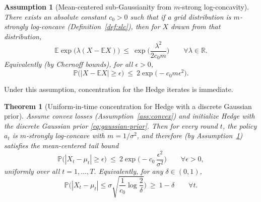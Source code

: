 \documentclass[11pt]{article}
\newtheorem{theorem}{Theorem}
\newtheorem{assumption}{Assumption}
\newtheorem{remark}{Remark}
\begin{document}
\begin{assumption}[Mean-centered sub-Gaussianity from $m$-strong log-concavity]\label{ass:subg}
    There exists an absolute constant $c_0>0$ such that if a grid distribution is $m$-strongly log-concave (Definition~\ref{def:slc}), then for $X$ drawn from that distribution,
    \[
        \mathbb{E}\exp\!\big(\lambda(X-\mathbb{E}X)\big)\ \le\ \exp\!\Big(\frac{\lambda^2}{2c_0 m}\Big)
        \qquad\forall \lambda\in\mathbb{R}.
    \]
    Equivalently (by Chernoff bounds), for all $\epsilon>0$,
    \[
        \mathbb{P}\big(|X-\mathbb{E}X|\ge \epsilon\big)\ \le\ 2\exp\!\big(-c_0 m \epsilon^2\big).
    \]
\end{assumption}


Under this assumption, concentration for the Hedge iterates is immediate.

\begin{theorem}[Uniform-in-time concentration for Hedge with a discrete Gaussian prior]\label{thm:concentration}
    Assume convex losses (Assumption~\ref{ass:convex}) and initialize Hedge with the discrete Gaussian prior \eqref{eq:gaussian-prior}.
    Then for every round $t$, the policy $a_t$ is $m$-strongly log-concave with $m=1/\sigma^2$, and therefore (by Assumption~\ref{ass:subg}) satisfies the mean-centered tail bound
    \begin{equation}\label{eq:mean-tail}
        \mathbb{P}\big(|X_t-\mu_t|\ge \epsilon\big)\ \le\ 2\exp\!\Big(-c_0\,\frac{\epsilon^2}{\sigma^2}\Big)
        \qquad\forall \epsilon>0,
    \end{equation}
    uniformly over all $t=1,\dots,T$.
    Equivalently, for any $\delta\in(0,1)$,
    \begin{equation}\label{eq:eps-delta}
        \mathbb{P}\Big(|X_t-\mu_t|\le \sigma\sqrt{\frac{1}{c_0}\log\frac{2}{\delta}}\Big)\ \ge\ 1-\delta
        \qquad\forall t.
    \end{equation}
\end{theorem}
\end{document}
